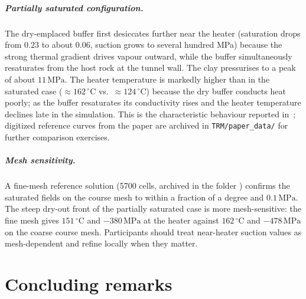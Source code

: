 \documentclass[11pt,a4paper]{tubaf-report}
\newcommand{\MPa}{\,\mathrm{MPa}}
\newcommand{\degC}{\,^\circ\mathrm{C}}
\begin{document}
\paragraph{Partially saturated configuration.}
The dry-emplaced buffer first desiccates further near the heater
(saturation drops from $0.23$ to about $0.06$, suction grows to several
hundred MPa) because the strong thermal gradient drives vapour outward,
while the buffer simultaneously resaturates from the host rock at the tunnel
wall. The clay pressurises to a peak of about $11\MPa$. The heater
temperature is markedly higher than in the saturated case
($\approx162\degC$ vs.\ $\approx124\degC$) because the dry buffer conducts
heat poorly; as the buffer resaturates its conductivity rises and the heater
temperature declines late in the simulation. This is the characteristic
behaviour reported in~\cite{pitz2023}; digitized reference curves from the
paper are archived in \texttt{TRM/paper\_data/} for further comparison
exercises.

\paragraph{Mesh sensitivity.}
A fine-mesh reference solution (5700 cells, archived in the folder
) confirms the saturated
fields on the course mesh to within a fraction of a degree and
$0.1\MPa$. The steep dry-out front of the partially saturated case is more
mesh-sensitive: the fine mesh gives $151\degC$ and $-380\MPa$ at the heater
against $162\degC$ and $-478\MPa$ on the coarse course mesh. Participants
should treat near-heater suction values as mesh-dependent and refine locally
when they matter.

\chapter{Concluding remarks}
\end{document}
